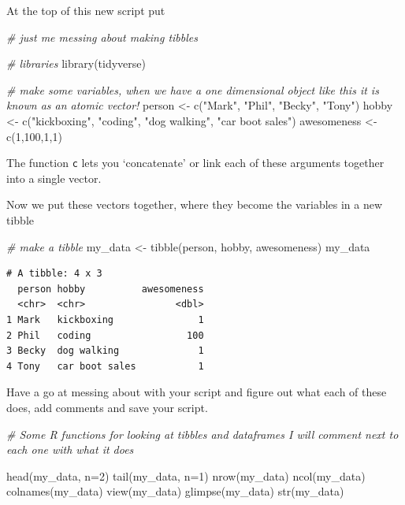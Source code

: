 \documentclass[
]{book}
\newenvironment{Shaded}{\begin{snugshade}}{\end{snugshade}}
\newcommand{\AttributeTok}[1]{\textcolor[rgb]{0.77,0.63,0.00}{#1}}
\newcommand{\CommentTok}[1]{\textcolor[rgb]{0.56,0.35,0.01}{\textit{#1}}}
\newcommand{\DecValTok}[1]{\textcolor[rgb]{0.00,0.00,0.81}{#1}}
\newcommand{\FunctionTok}[1]{\textcolor[rgb]{0.00,0.00,0.00}{#1}}
\newcommand{\NormalTok}[1]{#1}
\newcommand{\OtherTok}[1]{\textcolor[rgb]{0.56,0.35,0.01}{#1}}
\newcommand{\StringTok}[1]{\textcolor[rgb]{0.31,0.60,0.02}{#1}}
\begin{document}
At the top of this new script put

\begin{Shaded}
\begin{Highlighting}[]
\CommentTok{\# just me messing about making tibbles}

\CommentTok{\# libraries}
\FunctionTok{library}\NormalTok{(tidyverse)}

\CommentTok{\# make some variables, when we have a one dimensional object like this it is known as an atomic vector!}
\NormalTok{person }\OtherTok{\textless{}{-}} \FunctionTok{c}\NormalTok{(}\StringTok{"Mark"}\NormalTok{, }\StringTok{"Phil"}\NormalTok{, }\StringTok{"Becky"}\NormalTok{, }\StringTok{"Tony"}\NormalTok{)}
\NormalTok{hobby }\OtherTok{\textless{}{-}} \FunctionTok{c}\NormalTok{(}\StringTok{"kickboxing"}\NormalTok{, }\StringTok{"coding"}\NormalTok{, }\StringTok{"dog walking"}\NormalTok{, }\StringTok{"car boot sales"}\NormalTok{)}
\NormalTok{awesomeness }\OtherTok{\textless{}{-}} \FunctionTok{c}\NormalTok{(}\DecValTok{1}\NormalTok{,}\DecValTok{100}\NormalTok{,}\DecValTok{1}\NormalTok{,}\DecValTok{1}\NormalTok{)}
\end{Highlighting}
\end{Shaded}

The function \texttt{c} lets you `concatenate' or link each of these arguments together into a single vector.

Now we put these vectors together, where they become the variables in a new tibble

\begin{Shaded}
\begin{Highlighting}[]
\CommentTok{\# make a tibble}
\NormalTok{my\_data }\OtherTok{\textless{}{-}} \FunctionTok{tibble}\NormalTok{(person, hobby, awesomeness)}
\NormalTok{my\_data}
\end{Highlighting}
\end{Shaded}

\begin{verbatim}
# A tibble: 4 x 3
  person hobby          awesomeness
  <chr>  <chr>                <dbl>
1 Mark   kickboxing               1
2 Phil   coding                 100
3 Becky  dog walking              1
4 Tony   car boot sales           1
\end{verbatim}

Have a go at messing about with your script and figure out what each of these does, add comments and save your script.

\begin{Shaded}
\begin{Highlighting}[]
\CommentTok{\# Some R functions for looking at tibbles and dataframes I will comment next to each one with what it does}

\FunctionTok{head}\NormalTok{(my\_data, }\AttributeTok{n=}\DecValTok{2}\NormalTok{)}
\FunctionTok{tail}\NormalTok{(my\_data, }\AttributeTok{n=}\DecValTok{1}\NormalTok{)}
\FunctionTok{nrow}\NormalTok{(my\_data)}
\FunctionTok{ncol}\NormalTok{(my\_data)}
\FunctionTok{colnames}\NormalTok{(my\_data)}
\FunctionTok{view}\NormalTok{(my\_data)}
\FunctionTok{glimpse}\NormalTok{(my\_data)}
\FunctionTok{str}\NormalTok{(my\_data)}
\end{Highlighting}
\end{Shaded}
\end{document}
